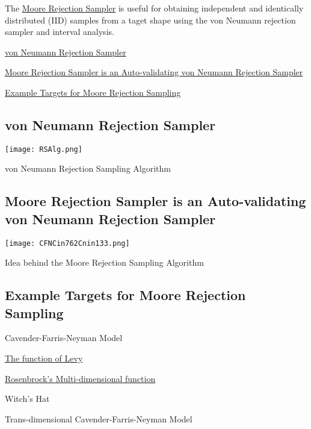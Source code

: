 \-The \hyperlink{moorerejsam}{\-Moore \-Rejection \-Sampler} is useful for obtaining independent and identically distributed (\-I\-I\-D) samples from a taget shape using the von \-Neumann rejection sampler and interval analysis.


\begin{DoxyItemize}
\item \hyperlink{moorerejsam_moorerejsam_sec_RSAlg}{von \-Neumann \-Rejection \-Sampler}
\item \hyperlink{moorerejsam_moorerejsam_sec_MRS}{\-Moore \-Rejection \-Sampler is an \-Auto-\/validating von \-Neumann \-Rejection \-Sampler}
\item \hyperlink{moorerejsam_moorerejsam_sec_examples}{\-Example \-Targets for \-Moore \-Rejection \-Sampling}
\end{DoxyItemize}\hypertarget{moorerejsam_moorerejsam_sec_RSAlg}{}\subsection{von Neumann Rejection Sampler}\label{moorerejsam_moorerejsam_sec_RSAlg}
 
\begin{DoxyImage}
\texttt{[image: RSAlg.png]}
\caption{von \-Neumann \-Rejection \-Sampling \-Algorithm}
\end{DoxyImage}
\hypertarget{moorerejsam_moorerejsam_sec_MRS}{}\subsection{\-Moore Rejection Sampler is an Auto-\/validating von Neumann Rejection Sampler}\label{moorerejsam_moorerejsam_sec_MRS}
 
\begin{DoxyImage}
\texttt{[image: CFNCin762Cnin133.png]}
\caption{\-Idea behind the \-Moore \-Rejection \-Sampling \-Algorithm}
\end{DoxyImage}
\hypertarget{moorerejsam_moorerejsam_sec_examples}{}\subsection{\-Example Targets for Moore Rejection Sampling}\label{moorerejsam_moorerejsam_sec_examples}

\begin{DoxyItemize}
\item \-Cavender-\/\-Farris-\/\-Neyman \-Model
\item \hyperlink{target_examples_MRSexamsec_Levy}{\-The function of \-Levy}
\item \hyperlink{target_examples_MRSexamsec_Rosenbrock}{\-Rosenbrock's \-Multi-\/dimensional function}
\item \-Witch's \-Hat
\item \-Trans-\/dimensional \-Cavender-\/\-Farris-\/\-Neyman \-Model 
\end{DoxyItemize}